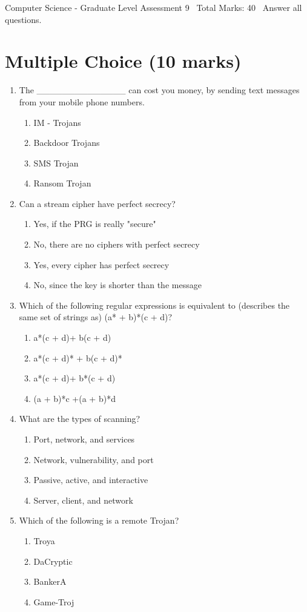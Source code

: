 \documentclass[12pt]{article}
\begin{document}
\begin{center}
Computer Science - Graduate Level Assessment 9 \
Total Marks: 40 \
Answer all questions.
\end{center}

\section*{Multiple Choice (10 marks)}
\begin{enumerate}[label=\arabic*.]
\item The \_\_\_\_\_\_\_\_\_\_\_\_\_\_ can cost you money, by sending text messages from your mobile phone numbers.
\begin{enumerate}[label=(\alph*)]
    \item IM - Trojans
    \item Backdoor Trojans
    \item SMS Trojan
    \item Ransom Trojan
\end{enumerate}
\item Can a stream cipher have perfect secrecy?
\begin{enumerate}[label=(\alph*)]
    \item Yes, if the PRG is really "secure"
    \item No, there are no ciphers with perfect secrecy
    \item Yes, every cipher has perfect secrecy
    \item No, since the key is shorter than the message
\end{enumerate}
\item Which of the following regular expressions is equivalent to (describes the same set of strings as) (a* + b)*(c + d)?
\begin{enumerate}[label=(\alph*)]
    \item a*(c + d)+ b(c + d)
    \item a*(c + d)* + b(c + d)*
    \item a*(c + d)+ b*(c + d)
    \item (a + b)*c +(a + b)*d
\end{enumerate}
\item What are the types of scanning?
\begin{enumerate}[label=(\alph*)]
    \item Port, network, and services
    \item Network, vulnerability, and port
    \item Passive, active, and interactive
    \item Server, client, and network
\end{enumerate}
\item Which of the following is a remote Trojan?
\begin{enumerate}[label=(\alph*)]
    \item Troya
    \item DaCryptic
    \item BankerA
    \item Game-Troj
\end{enumerate}
\end{enumerate}
\end{document}

